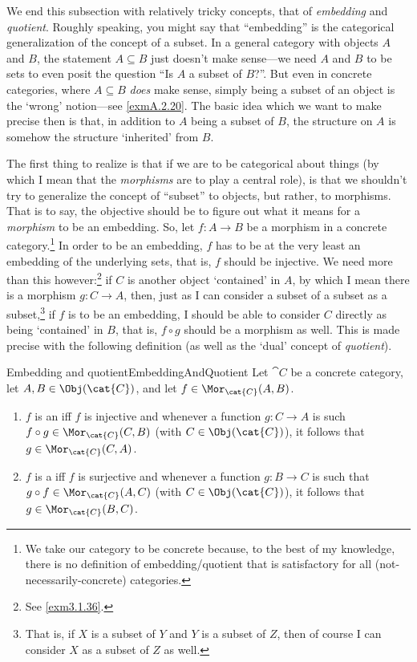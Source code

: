 We end this subsection with relatively tricky concepts, that of \emph{embedding} and \emph{quotient}.  Roughly speaking, you might say that ``embedding'' is the categorical generalization of the concept of a subset.  In a general category with objects $A$ and $B$, the statement $A\subseteq B$ just doesn't make sense---we need $A$ and $B$ to be sets to even posit the question ``Is $A$ a subset of $B$?''.  But even in concrete categories, where $A\subseteq B$ \emph{does} make sense, simply being a subset of an object is the `wrong' notion---see \cref{exmA.2.20}.  The basic idea which we want to make precise then is that, in addition to $A$ being a subset of $B$, the structure on $A$ is somehow the structure `inherited' from $B$.

The first thing to realize is that if we are to be categorical about things (by which I mean that the \emph{morphisms} are to play a central role), is that we shouldn't try to generalize the concept of ``subset'' to objects, but rather, to morphisms.  That is to say, the objective should be to figure out what it means for a \emph{morphism} to be an embedding.  So, let $f\colon A\rightarrow B$ be a morphism in a concrete category.\footnote{We take our category to be concrete because, to the best of my knowledge, there is no definition of embedding/quotient that is satisfactory for all (not-necessarily-concrete) categories.}  In order to be an embedding, $f$ has to be at the very least an embedding of the underlying sets, that is, $f$ should be injective.  We need more than this however:\footnote{See \cref{exm3.1.36}.}  if $C$ is another object `contained' in $A$, by which I mean there is a morphism $g\colon C\rightarrow A$, then, just as I can consider a subset of a subset as a subset,\footnote{That is, if $X$ is a subset of $Y$ and $Y$ is a subset of $Z$, then of course I can consider $X$ as a subset of $Z$ as well.} if $f$ is to be an embedding, I should be able to consider $C$ directly as being `contained' in $B$, that is, $f\circ g$ should be a morphism as well.  This is made precise with the following definition (as well as the `dual' concept of \emph{quotient}).
\begin{dfn}{Embedding and quotient}{EmbeddingAndQuotient}
Let $\cat{C}$ be a concrete category, let $A,B\in \Obj (\cat{C})$, and let $f\in \Mor _{\cat{C}}(A,B)$.
\begin{enumerate}
\item $f$ is an  iff $f$ is injective and whenever a function $g\colon C\rightarrow A$ is such $f\circ g\in \Mor _{\cat{C}}(C,B)$ (with $C\in \Obj (\cat{C})$), it follows that $g\in \Mor _{\cat{C}}(C,A)$.
\item $f$ is a  iff $f$ is surjective and whenever a function $g\colon B\rightarrow C$ is such that $g\circ f\in \Mor _{\cat{C}}(A,C)$ (with $C\in \Obj (\cat{C})$), it follows that $g\in \Mor _{\cat{C}}(B,C)$.
\end{enumerate}
\end{dfn}
